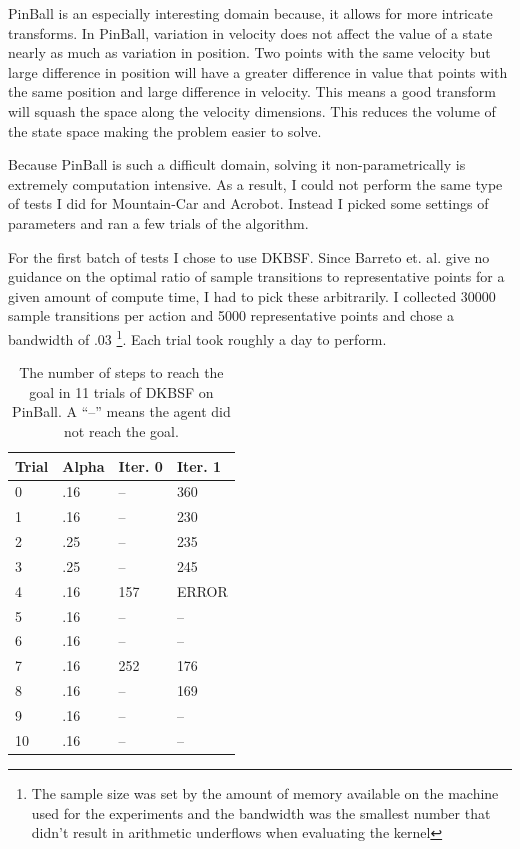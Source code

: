 PinBall is an especially interesting domain because, it allows for more
intricate transforms.
In PinBall, variation in velocity does not affect the value of a state nearly
as much as variation in position.
Two points with the same velocity but large difference in position will have
a greater difference in value that points with the same position and large
difference in velocity.
This means a good transform will squash the space along the velocity
dimensions.
This reduces the volume of the state space making the problem easier to solve.

Because PinBall is such a difficult domain, solving it non-parametrically is
extremely computation intensive.
As a result, I could not perform the same type of tests I did for Mountain-Car
and Acrobot. Instead I picked some settings of parameters and ran a few trials
of the algorithm.

For the first batch of tests I chose to use DKBSF.
Since Barreto et. al. \cite{kbsf} give no guidance on the optimal ratio of sample
transitions to representative points for a given amount of compute time,
I had to pick these arbitrarily.
I collected 30000 sample transitions per action and 5000 representative points 
and chose a bandwidth of .03 \footnote{The sample size was set by the amount of
memory available on the machine used for the experiments and the bandwidth was 
the smallest number that didn't result in arithmetic underflows when
evaluating the kernel}.
Each trial took roughly a day to perform.

\begin{table}[H]
\begin{center}
    \begin{tabular}{| l | l | l | l |}
    \hline
Trial & Alpha & Iter. 0 & Iter. 1 \\ \hline
0 & .16 & -- & 360\\
1 & .16 & -- & 230\\
2 & .25 & -- & 235\\
3 & .25 & -- & 245\\
4 & .16 & 157 & ERROR\\
5 & .16 & -- & --\\
6 & .16 & -- & --\\
7 & .16 & 252 & 176\\
8 & .16 & -- & 169\\
9 & .16 & -- & --\\
10 & .16 & -- & --\\
    \hline
    \end{tabular}
\end{center}
    \caption[DKBSF Pinball results]
{The number of steps to reach the goal in 11 trials of DKBSF on PinBall.
A ``--'' means the agent did not reach the goal.}
\end{table}

